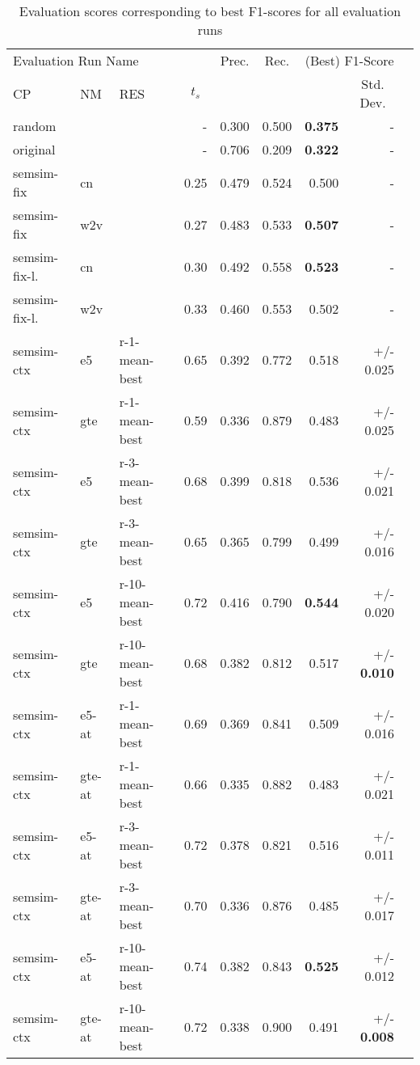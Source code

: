 \documentclass[11pt]{scrreprt}
\begin{document}
{\begin{table}
\centering
\begin{tabular}{lllrrrrrr}
\toprule
\multicolumn{4}{l}{Evaluation Run Name} & \multicolumn{1}{c}{Prec.} & \multicolumn{1}{c}{Rec.} & \multicolumn{2}{c}{(Best) F1-Score}\\
\cmidrule{1-4}\cmidrule{7-8}
\multicolumn{1}{l}{CP} & \multicolumn{1}{l}{NM} & \multicolumn{1}{l}{RES} & \multicolumn{1}{c}{\(t_s\)} & \multicolumn{3}{l}{} & \multicolumn{1}{c}{Std. Dev.} \\
\midrule
random &  &  & - & 0.300 & 0.500 & \textbf{0.375} & - \\
\hline
original &  &  & - & 0.706 & 0.209 & \textbf{0.322} & - \\
\hline
semsim-fix & cn &  & 0.25 & 0.479 & 0.524 & 0.500 & - \\
semsim-fix & w2v &  & 0.27 & 0.483 & 0.533 & \textbf{0.507} & - \\
\hline
semsim-fix-l. & cn &  & 0.30 & 0.492 & 0.558 & \textbf{0.523} & - \\
semsim-fix-l. & w2v &  & 0.33 & 0.460 & 0.553 & 0.502 & - \\
\hline
semsim-ctx & e5 & r-1-mean-best & 0.65 & 0.392 & 0.772 & 0.518 & +/- 0.025 \\
semsim-ctx & gte & r-1-mean-best & 0.59 & 0.336 & 0.879 & 0.483 & +/- 0.025 \\
semsim-ctx & e5 & r-3-mean-best & 0.68 & 0.399 & 0.818 & 0.536 & +/- 0.021 \\
semsim-ctx & gte & r-3-mean-best & 0.65 & 0.365 & 0.799 & 0.499 & +/- 0.016 \\
semsim-ctx & e5 & r-10-mean-best & 0.72 & 0.416 & 0.790 & \textbf{0.544} & +/- 0.020 \\
semsim-ctx & gte & r-10-mean-best & 0.68 & 0.382 & 0.812 & 0.517 & +/- \textbf{0.010} \\

\hline
semsim-ctx & e5-at & r-1-mean-best & 0.69 & 0.369 & 0.841 & 0.509 & +/- 0.016 \\
semsim-ctx & gte-at & r-1-mean-best & 0.66 & 0.335 & 0.882 & 0.483 & +/- 0.021 \\
semsim-ctx & e5-at & r-3-mean-best & 0.72 & 0.378 & 0.821 & 0.516 & +/- 0.011 \\
semsim-ctx & gte-at & r-3-mean-best & 0.70 & 0.336 & 0.876 & 0.485 & +/- 0.017 \\
semsim-ctx & e5-at & r-10-mean-best & 0.74 & 0.382 & 0.843 & \textbf{0.525} & +/- 0.012 \\
semsim-ctx & gte-at & r-10-mean-best & 0.72 & 0.338 & 0.900 & 0.491 & +/- \textbf{0.008} \\
\bottomrule
\end{tabular}
\caption{Evaluation scores corresponding to best F1-scores for all evaluation runs}
\label{tab:best-f1-score-mean-best}
\end{table}

}
\end{document}
